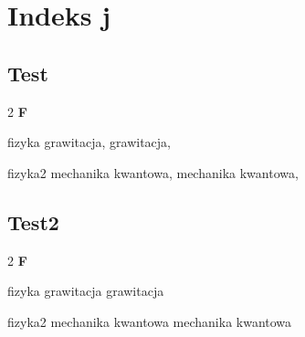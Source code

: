 \chapter*{Indeks j}
\section*{Test}
\begin{multicols}{2}
\textbf{F}\nopagebreak

\begin{minipage}{\linewidth}
fizyka \newline
\hspace*{1.5em} grawitacja, \pageref{latex_test1} \newline
\hspace*{1.5em} grawitacja, \pageref{latex_test3} \newline
\end{minipage}
\begin{minipage}{\linewidth}
fizyka2 \newline
\hspace*{1.5em} mechanika kwantowa, \pageref{latex_test2} \newline
\hspace*{1.5em} mechanika kwantowa, \pageref{latex_test4} \newline
\end{minipage}

\end{multicols}

\section*{Test2}
\begin{multicols}{2}
\textbf{F}\nopagebreak

\begin{minipage}{\linewidth}
fizyka \newline
\hspace*{1.5em} grawitacja \dotfill \pageref{latex_test1} \newline
\hspace*{1.5em} grawitacja \dotfill \pageref{latex_test3} \newline
\end{minipage}
\begin{minipage}{\linewidth}
fizyka2 \newline
\hspace*{1.5em} mechanika kwantowa \dotfill \pageref{latex_test2} \newline
\hspace*{1.5em} mechanika kwantowa \dotfill \pageref{latex_test4} \newline
\end{minipage}
\end{multicols}

